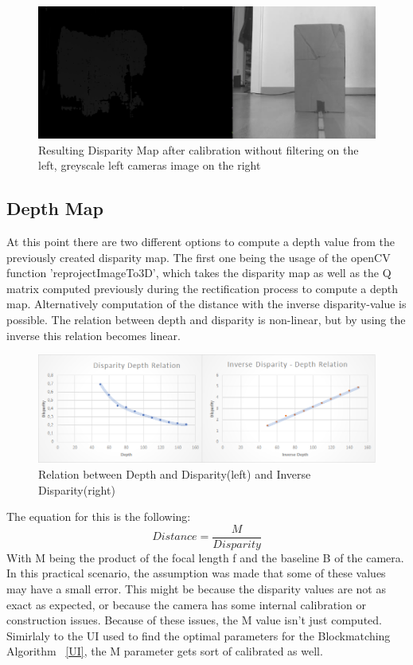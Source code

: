 \documentclass[journal,onecolumn]{IEEEtran}
\begin{document}
\begin{figure}[H]
	\centering
	\includegraphics[scale=0.5]{disparityMap.png}
	\captionsetup{justification=centering}
	\caption{Resulting Disparity Map after calibration without filtering on the left, greyscale left cameras image on the right}
\end{figure}

\subsection{Depth Map}
\noindent
\noindent At this point there are two different options to compute a depth value from the previously created disparity map. The first one being the usage of the openCV function 'reprojectImageTo3D', which takes the disparity map as well as the Q matrix computed  previously during the rectification process to compute a depth map.
Alternatively computation of the distance with the inverse disparity-value is possible. The relation between depth and disparity is non-linear, but by using the inverse this relation becomes linear. 
\begin{figure}[H]
	\centering
	\includegraphics[scale=0.5]{ratios.png}
	\captionsetup{justification=centering}
	\caption{Relation between Depth and Disparity(left) and Inverse Disparity(right)}
\end{figure}
\noindent The equation for this is the following: 
\begin{equation}
	Distance = \frac{M}{Disparity}
\end{equation}
\noindent With M being the product of the focal length f and the baseline B of the camera. \newline
In this practical scenario, the assumption was made that some of these values may have a small error. This might be because the disparity values are not as exact as expected, or because the camera has some internal calibration or construction issues. Because of these issues, the  M value isn't just computed. Simirlaly to the UI used to find the optimal parameters for the Blockmatching Algorithm ~\ref{UI}, the M parameter gets sort of calibrated as well. 
\end{document}
